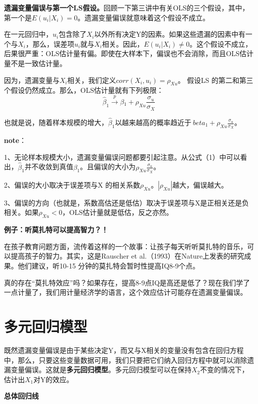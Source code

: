 \documentclass[cn,10pt,math=newtx,citestyle=gb7714-2015,bibstyle=gb7714-2015]{elegantbook}
\begin{document}
	\textbf{遗漏变量偏误与第一个LS假设。}回顾一下第三讲中有关OLS的三个假设，其中，第一个是$E(u_i|X_i)=0$。遗漏变量偏误就意味着这个假设不成立。
	
	在一元回归中，$u_i$包含除了$X_i$以外所有决定Y的因素。如果这些遗漏的因素中有一个与$X_i$，那么，误差项$u_i$就与$X_i$相关。因此，$E(u_i|X_i)\neq0$。这个假设不成立，后果很严重：OLS估计量有偏。即使在大样本下，偏误也不会消除，而且OLS估计量不是一致估计量。
	
	因为，遗漏变量与$X_i$相关，我们定义$corr(X_i,u_i)=\rho_{Xu}$。 假设LS 的第二和第三个假设仍然成立。那么，OLS估计量就有下列极限：
	\begin{equation}
		\hat{\beta}_1\xrightarrow{p}\beta{_1}+\rho_{Xu}\frac{\sigma{_u}}{\sigma{_X}}
	\end{equation}
	
	也就是说，随着样本规模的增大，$\hat{\beta}_1$以越来越高的概率趋近于$\ beta{_1}+\rho_{Xu}\frac{\sigma{_u}}{\sigma{_X}}$。
	
	\textbf{note}：
	
	1、无论样本规模大小，遗漏变量偏误问题都要引起注意。从公式（1）中可以看出，$\hat{\beta}_1$并不收敛到真值$\beta_1$。且偏误的大小为$\rho_{Xu}\frac{\sigma{_u}}{\sigma{_X}}$。
	
	2、偏误的大小取决于误差项与X 的相关系数$\rho_{Xu}$。$|\rho_{Xu}|$越大，偏误越大。
	
	3、偏误的方向（也就是，系数高估还是低估）取决于误差项与X是正相关还是负相关。如果$\rho_{Xu}<0$，OLS估计量就是低估，反之亦然。
	
	\textbf{例子：听莫扎特可以提高智力？！}
	
	在孩子教育问题方面，流传着这样的一个故事：让孩子每天听听莫扎特的音乐，可以提高孩子的智力。其实，这是Rauscher et al.（1993）在Nature上发表的研究成果。他们建议，听10-15 分钟的莫扎特会暂时性提高IQ8-9个点。
	
	真的存在“莫扎特效应”吗？如果存在，提高8-9点IQ是高还是低了？现在我们学了一点计量了，我们用计量经济学的语言，这个效应估计可能存在遗漏变量偏误。
	
	\section{多元回归模型}
	既然遗漏变量偏误是由于某些决定Y，而又与X相关的变量没有包含在回归方程中，那么，只要这些变量数据可用，我们只要把它们纳入回归方程中就可以消除遗漏变量偏误。这就是\textbf{多元回归模型}。多元回归模型可以在保持$X_2$不变的情况下，估计出$X_1$对Y的效应。
	
	\textbf{总体回归线}
	
\end{document}
